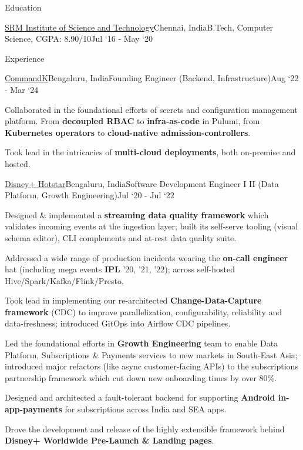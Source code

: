 \documentclass{resume}
\begin{document}
\begin{rSection}{Education}
  \begin{rEmptySubsection}{\href{https://www.srmist.edu.in/}{SRM Institute of Science and Technology}}{Chennai, India}{B.Tech, Computer Science, CGPA: 8.90/10}{Jul `16 - May `20}
  \end{rEmptySubsection}

\end{rSection}

\begin{rSection}{Experience}

  \begin{rSubsection}{\href{https://commandk.dev}{CommandK}}{Bengaluru, India}{Founding Engineer (Backend, Infrastructure)}{Aug `22 - Mar `24}
    \item Collaborated in the foundational efforts of secrets and configuration management platform. From \textbf{decoupled RBAC} to \textbf{infra-as-code} in Pulumi, from \textbf{Kubernetes operators} to \textbf{cloud-native admission-controllers}.
    \item Took lead in the intricacies of \textbf{multi-cloud deployments}, both on-premise and hosted.
          \end{rSubsection}

  \begin{rSubsection}{\href{https://tech.hotstar.com}{Disney+ Hotstar}}{Bengaluru, India}{Software Development Engineer I \textrightarrow II (Data Platform, Growth Engineering)}{Jul `20 - Jul `22}
    \item Designed \& implemented a \textbf{streaming data quality framework} which validates incoming events at the ingestion layer; built its self-serve tooling (visual schema editor), CLI complements and at-rest data quality suite.
    \item Addressed a wide range of production incidents wearing the \textbf{on-call engineer} hat (including mega events \textbf{IPL} '20, '21, '22); across self-hosted Hive/Spark/Kafka/Flink/Presto.
    \item Took lead in implementing our re-architected \textbf{Change-Data-Capture framework} (CDC) to improve parallelization, configurability, reliability and data-freshness; introduced GitOps into Airflow CDC pipelines.
    \item Led the foundational efforts in \textbf{Growth Engineering} team to enable Data Platform, Subscriptions \& Payments services to new markets in South-East Asia; introduced major refactors (like async customer-facing APIs) to the subscriptions partnership framework which cut down new onboarding times by over 80\%.
    \item Designed and architected a fault-tolerant backend for supporting \textbf{Android in-app-payments} for subscriptions across India and SEA apps.
    \item Drove the development and release of the highly extensible framework behind \textbf{Disney+ Worldwide Pre-Launch \& Landing pages}.
      \end{rSubsection}


\end{rSection}
\end{document}
